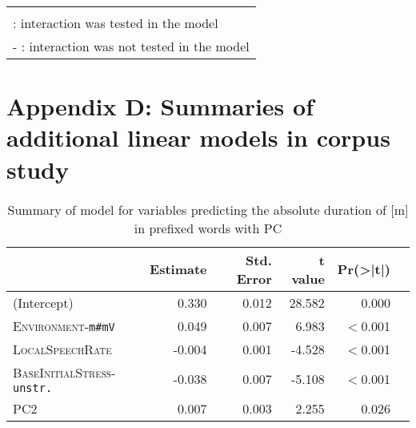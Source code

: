 \begin{table}
{\begin{tabular}{lrrrrr}
		\midrule\\
						\multicolumn{6}{l}{\small \checkmark \hspace*{0.2cm}: interaction was tested in the model} \\			
						\multicolumn{6}{l}{\small - \hspace*{0.45cm}: interaction was not tested in the model} \\			
		
			\end{tabular}
}

\end{table}



\clearpage

\section*{Appendix D: Summaries of additional linear models in corpus study}\label{Appendix D: model summaries corpus}


\begin{table}
	
	\caption{ Summary of model for variables predicting the absolute duration of [m] in prefixed words with PC}
	\label{model im PC Corpus abs}

	\begin{tabular}{lrrrrr}
				\lsptoprule
		& Estimate                       & Std. Error            & t value & Pr(\textgreater|t|)  \\ \midrule
(Intercept) & 0.330 & 0.012 & 28.582 & 0.000 \\ 
\textsc{Environment}-\texttt{m\#mV}& 0.049 & 0.007 & 6.983 & $<$0.001\\ 
\textsc{LocalSpeechRate }& -0.004 & 0.001 & -4.528 & $<$0.001\\ 
\textsc{BaseInitialStress}-\texttt{unstr.} & -0.038 & 0.007 & -5.108 &  $<$0.001 \\ 
\textsc{PC2 }& 0.007 & 0.003 & 2.255 & 0.026 \\
		\midrule	
	\end{tabular}
\end{table}



